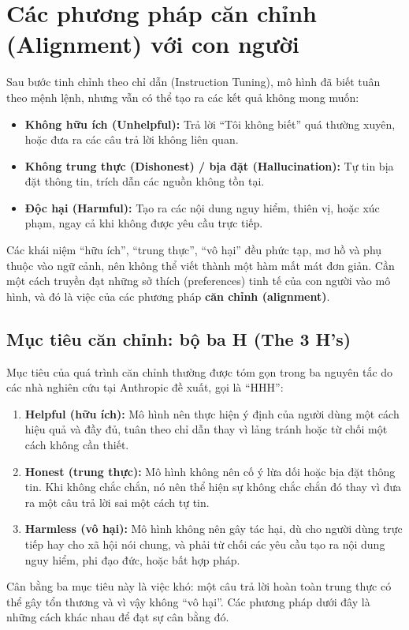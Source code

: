 
\section{Các phương pháp căn chỉnh (Alignment) với con người}
\label{sec:alignment_methods}

Sau bước tinh chỉnh theo chỉ dẫn (Instruction Tuning), mô hình đã biết tuân theo mệnh lệnh, nhưng vẫn có thể tạo ra các kết quả không mong muốn:
\begin{itemize}
    \item \textbf{Không hữu ích (Unhelpful):} Trả lời “Tôi không biết” quá thường xuyên, hoặc đưa ra các câu trả lời không liên quan.
    \item \textbf{Không trung thực (Dishonest) / bịa đặt (Hallucination):} Tự tin bịa đặt thông tin, trích dẫn các nguồn không tồn tại.
    \item \textbf{Độc hại (Harmful):} Tạo ra các nội dung nguy hiểm, thiên vị, hoặc xúc phạm, ngay cả khi không được yêu cầu trực tiếp.
\end{itemize}

Các khái niệm “hữu ích”, “trung thực”, “vô hại” đều phức tạp, mơ hồ và phụ thuộc vào ngữ cảnh, nên không thể viết thành một hàm mất mát đơn giản. Cần một cách truyền đạt những sở thích (preferences) tinh tế của con người vào mô hình, và đó là việc của các phương pháp \textbf{căn chỉnh (alignment)}.

\subsection{Mục tiêu căn chỉnh: bộ ba H (The 3 H's)}
\label{ssec:alignment_goals}
Mục tiêu của quá trình căn chỉnh thường được tóm gọn trong ba nguyên tắc do các nhà nghiên cứu tại Anthropic đề xuất, gọi là “HHH”:
\begin{enumerate}
    \item \textbf{Helpful (hữu ích):} Mô hình nên thực hiện ý định của người dùng một cách hiệu quả và đầy đủ, tuân theo chỉ dẫn thay vì lảng tránh hoặc từ chối một cách không cần thiết.
    \item \textbf{Honest (trung thực):} Mô hình không nên cố ý lừa dối hoặc bịa đặt thông tin. Khi không chắc chắn, nó nên thể hiện sự không chắc chắn đó thay vì đưa ra một câu trả lời sai một cách tự tin.
    \item \textbf{Harmless (vô hại):} Mô hình không nên gây tác hại, dù cho người dùng trực tiếp hay cho xã hội nói chung, và phải từ chối các yêu cầu tạo ra nội dung nguy hiểm, phi đạo đức, hoặc bất hợp pháp.
\end{enumerate}
Cân bằng ba mục tiêu này là việc khó: một câu trả lời hoàn toàn trung thực có thể gây tổn thương và vì vậy không “vô hại”. Các phương pháp dưới đây là những cách khác nhau để đạt sự cân bằng đó.

